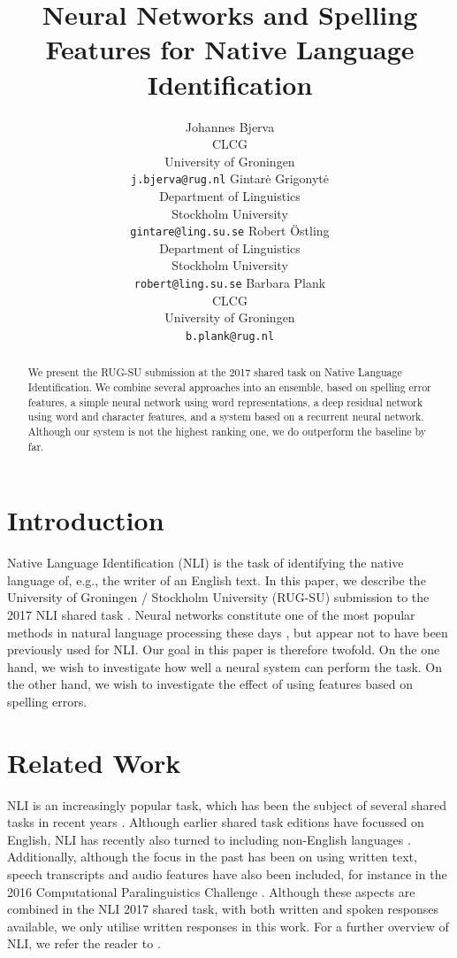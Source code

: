 \documentclass[11pt,letterpaper]{article}
\title{Neural Networks and Spelling Features for Native Language Identification}
\author{Johannes Bjerva \\ CLCG \\ University of Groningen \\ {\tt j.bjerva@rug.nl}
        \And Gintar\.e Grigonyt\.e \\ Department of Linguistics \\ Stockholm University \\ {\tt gintare@ling.su.se}
        \AND Robert {\"O}stling \\ Department of Linguistics \\  Stockholm University \\ {\tt robert@ling.su.se}
        \And Barbara Plank \\ CLCG \\ University of Groningen \\ {\tt b.plank@rug.nl}
}
\date{}
\begin{document}
\maketitle

\begin{abstract}
    We present the RUG-SU submission at the 2017 shared task on Native
    Language Identification.
    We combine several approaches into an ensemble, based on spelling error features, a simple neural network using word representations, a deep residual network using word and character features, and a system based on a recurrent neural network.
    Although our system is not the highest ranking one, we do outperform the baseline by far.
\end{abstract}


\section{Introduction}

Native Language Identification (NLI) is the task of identifying the native language of, e.g., the writer of an English text.
In this paper, we describe the University of Groningen / Stockholm University (RUG-SU) submission to the 2017 NLI shared task \citep{nli2017}.
Neural networks constitute one of the most popular methods in natural language processing these days \citep{manning:2016}, but appear not to have been previously used for NLI.
Our goal in this paper is therefore twofold.
On the one hand, we wish to investigate how well a neural system can perform the task.
On the other hand, we wish to investigate the effect of using features based on spelling errors.

\section{Related Work}

NLI is an increasingly popular task, which has been the subject of several shared tasks in recent years \citep{nli2013,compare2016,nli2017}.
Although earlier shared task editions have focussed on English, NLI has recently also turned to including non-English languages \citep{multilingual-nli}.
Additionally, although the focus in the past has been on using written text, speech transcripts and audio features have also been included, for instance in the 2016 Computational Paralinguistics Challenge \citep{compare2016}.
Although these aspects are combined in the NLI 2017 shared task, with both written and spoken responses available, we only utilise written responses in this work.
For a further overview of NLI, we refer the reader to \citet{malmasi2016}.
\end{document}
